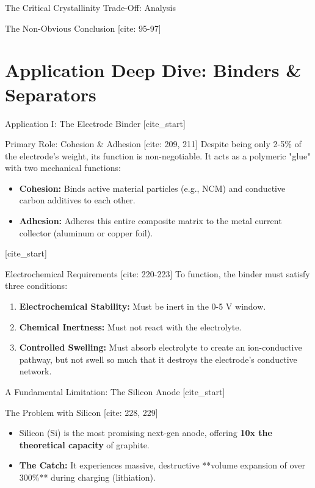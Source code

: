 \documentclass[aspectratio=169]{beamer}
\begin{document}
\begin{frame}{The Critical Crystallinity Trade-Off: Analysis}
\begin{alertblock}{The Non-Obvious Conclusion [cite: 95-97]}
\section{Application Deep Dive: Binders \& Separators}

\begin{frame}{Application I: The Electrode Binder}
    [cite_start]\begin{block}{Primary Role: Cohesion & Adhesion [cite: 209, 211]}
        Despite being only 2-5\% of the electrode's weight, its function is non-negotiable. It acts as a polymeric "glue" with two mechanical functions:
        \begin{itemize}
            \item \textbf{Cohesion:} Binds active material particles (e.g., NCM) and conductive carbon additives to each other.
            \item \textbf{Adhesion:} Adheres this entire composite matrix to the metal current collector (aluminum or copper foil).
        \end{itemize}
    \end{block}
    
    [cite_start]\begin{block}{Electrochemical Requirements [cite: 220-223]}
        To function, the binder must satisfy three conditions:
        \begin{enumerate}
            \item \textbf{Electrochemical Stability:} Must be inert in the 0-5 V window.
            \item \textbf{Chemical Inertness:} Must not react with the electrolyte.
            \item \textbf{Controlled Swelling:} Must absorb electrolyte to create an ion-conductive pathway, but not swell so much that it destroys the electrode's conductive network.
        \end{enumerate}
    \end{block}
\end{frame}

\begin{frame}{A Fundamental Limitation: The Silicon Anode}
    [cite_start]\begin{alertblock}{The Problem with Silicon [cite: 228, 229]}
        \begin{itemize}
            \item Silicon (Si) is the most promising next-gen anode, offering \textbf{10x the theoretical capacity} of graphite.
            \item \textbf{The Catch:} It experiences massive, destructive **volume expansion of over 300\%** during charging (lithiation).
        \end{itemize}
    \end{alertblock}
    

\end{frame}
\end{alertblock}
\end{frame}
\end{document}
